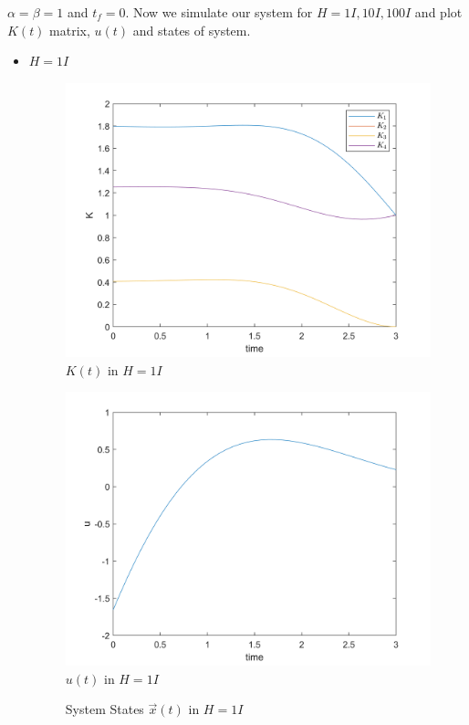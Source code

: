 $\alpha = \beta = 1$ and $t_f= 0$.
Now we simulate our system for $H = 1I, 10I, 100I$ and plot $K(t)$ matrix, $u(t)$ and states of system.

\begin{itemize}
	\item $H = 1I$
	\begin{figure}[H]
		\caption{$K(t)$ in $H = 1I$}
		\centering
		\includegraphics[width=12cm]{../Code/Q3/figures/KH1.png}
	\end{figure}
\begin{figure}[H]
	\caption{$u(t)$ in $H = 1I$}
	\centering
	\includegraphics[width=12cm]{../Code/Q3/figures/uH1.png}
\end{figure}
\begin{figure}[H]
	\caption{System States $\vec x(t)$ in $H = 1I$}
	\centering

\end{figure}
\end{itemize}
